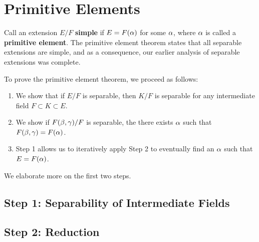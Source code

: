 \section{Primitive Elements}

Call an extension $E/F$ \textbf{simple} if $E = F(\alpha)$ for some $\alpha$, where $\alpha$ is called a \textbf{primitive element}. The primitive element theorem states that all separable extensions are simple, and as a consequence, our earlier analysis of separable extensions was complete.

To prove the primitive element theorem, we proceed as follows:
\begin{enumerate}
    \item We show that if $E/F$ is separable, then $K/F$ is separable for any intermediate field $F \subset K \subset E$.
    \item We show if $F(\beta, \gamma)/F$ is separable, the there exists $\alpha$ such that $F(\beta, \gamma) = F(\alpha)$.
    \item Step 1 allows us to iteratively apply Step 2 to eventually find an $\alpha$ such that $E = F(\alpha)$.
\end{enumerate}

We elaborate more on the first two steps.

\subsection{Step 1: Separability of Intermediate Fields}

\subsection{Step 2: Reduction}

